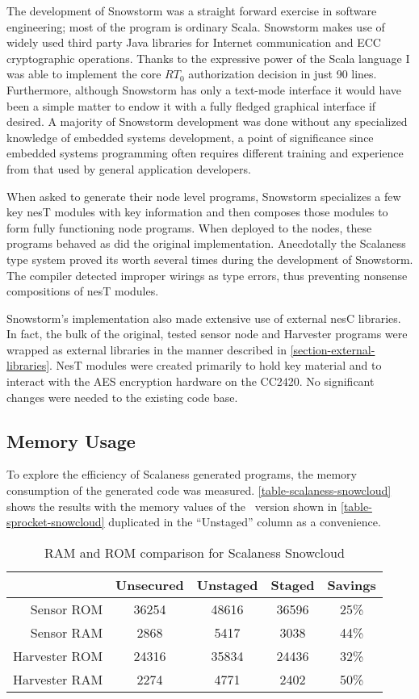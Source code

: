 The development of Snowstorm was a straight forward exercise in software engineering; most of
the program is ordinary Scala. Snowstorm makes use of widely used third party Java libraries for
Internet communication and ECC cryptographic operations. Thanks to the expressive power of the
Scala language I was able to implement the core $RT_0$ authorization decision in just 90 lines.
Furthermore, although Snowstorm has only a text-mode interface it would have been a simple
matter to endow it with a fully fledged graphical interface if desired. A majority of Snowstorm
development was done without any specialized knowledge of embedded systems development, a point
of significance since embedded systems programming often requires different training and
experience from that used by general application developers.

When asked to generate their node level programs, Snowstorm specializes a few key nesT modules
with key information and then composes those modules to form  fully functioning node programs.
When deployed to the nodes, these programs behaved as did the original implementation.
Anecdotally the Scalaness type system proved its worth several times during the development of
Snowstorm. The compiler detected improper wirings as type errors, thus preventing nonsense
compositions of nesT modules. 

Snowstorm's implementation also made extensive use of external nesC libraries. In fact, the bulk
of the original, tested sensor node and Harvester programs were wrapped as external libraries in
the manner described in \autoref{section-external-libraries}. NesT modules were created
primarily to hold key material and to interact with the AES encryption hardware on the CC2420.
No significant changes were needed to the existing code base.

\subsection{Memory Usage}

To explore the efficiency of Scalaness generated programs, the memory consumption of the
generated code was measured. \autoref{table-scalaness-snowcloud} shows the results with the
memory values of the \Sprocket\ version shown in \autoref{table-sprocket-snowcloud} duplicated
in the ``Unstaged'' column as a convenience.

\begin{table}[h]
\centering \newcommand\T{\rule{0pt}{2.1ex}}
\caption{RAM and ROM comparison for Scalaness Snowcloud} {
\begin{tabular}{|r||c|c|c|c|} \hline \hline
              & Unsecured & Unstaged & Staged & Savings\\ \hline
Sensor ROM    &     36254 &    48616 &  36596 & 25\% \\
Sensor RAM    &      2868 &     5417 &   3038 & 44\% \\ \hline
Harvester ROM &     24316 &    35834 &  24436 & 32\% \\
Harvester RAM &      2274 &     4771 &   2402 & 50\% \\ \hline
\end{tabular}
}
\label{table-scalaness-snowcloud}
\end{table}


